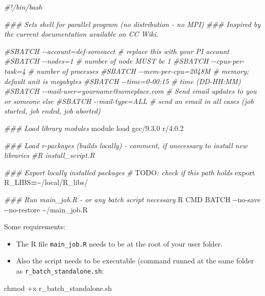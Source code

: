 \documentclass[
]{book}
\newenvironment{Shaded}{\begin{snugshade}}{\end{snugshade}}
\newcommand{\AlertTok}[1]{\textcolor[rgb]{0.94,0.16,0.16}{#1}}
\newcommand{\AttributeTok}[1]{\textcolor[rgb]{0.77,0.63,0.00}{#1}}
\newcommand{\BuiltInTok}[1]{#1}
\newcommand{\CommentTok}[1]{\textcolor[rgb]{0.56,0.35,0.01}{\textit{#1}}}
\newcommand{\ExtensionTok}[1]{#1}
\newcommand{\FunctionTok}[1]{\textcolor[rgb]{0.00,0.00,0.00}{#1}}
\newcommand{\NormalTok}[1]{#1}
\newcommand{\OperatorTok}[1]{\textcolor[rgb]{0.81,0.36,0.00}{\textbf{#1}}}
\newcommand{\VariableTok}[1]{\textcolor[rgb]{0.00,0.00,0.00}{#1}}
\providecommand{\tightlist}{%
  \setlength{\itemsep}{0pt}\setlength{\parskip}{0pt}}
\begin{document}
\begin{Shaded}
\begin{Highlighting}[]
\CommentTok{\#!/bin/bash}

\CommentTok{\#\#\# Sets shell for parallel program (no distribution {-} no MPI)}
\CommentTok{\#\#\# Inspired by the current documentation available on CC Wiki.}

\CommentTok{\#SBATCH {-}{-}account=def{-}someacct             \# replace this with your PI account}
\CommentTok{\#SBATCH {-}{-}nodes=1                          \# number of node MUST be 1}
\CommentTok{\#SBATCH {-}{-}cpus{-}per{-}task=4                  \# number of processes}
\CommentTok{\#SBATCH {-}{-}mem{-}per{-}cpu=2048M                \# memory; default unit is megabytes}
\CommentTok{\#SBATCH {-}{-}time=0{-}00:15                     \# time (DD{-}HH:MM)}
\CommentTok{\#SBATCH {-}{-}mail{-}user=yourname@someplace.com \# Send email updates to you or someone else}
\CommentTok{\#SBATCH {-}{-}mail{-}type=ALL                    \# send an email in all cases (job started, job ended, job aborted)}

\CommentTok{\#\#\# Load library modules}
\ExtensionTok{module}\NormalTok{ load gcc/9.3.0 r/4.0.2}

\CommentTok{\#\#\# Load r{-}packages (builds locally) {-} comment, if unecessary to install new libraries}
\CommentTok{\#R install\_script.R}

\CommentTok{\#\#\# Export locally installed packages}
\CommentTok{\# }\AlertTok{TODO}\CommentTok{: check if this path holds}
\BuiltInTok{export} \VariableTok{R\_LIBS}\OperatorTok{=}\NormalTok{\textasciitilde{}/local/R\_libs/}

\CommentTok{\#\#\# Run main\_job.R {-} or any batch script necessary}
\ExtensionTok{R}\NormalTok{ CMD BATCH }\AttributeTok{{-}{-}no{-}save} \AttributeTok{{-}{-}no{-}restore}\NormalTok{ \textasciitilde{}/main\_job.R}
\end{Highlighting}
\end{Shaded}

Some requirements:

\begin{itemize}
\tightlist
\item
  The R file \texttt{main\_job.R} needs to be at the root of your user folder.
\item
  Also the script needs to be executable (command runned at the same folder
  as \texttt{r\_batch\_standalone.sh}:
\end{itemize}

\begin{Shaded}
\begin{Highlighting}[]
\FunctionTok{chmod}\NormalTok{ +x r\_batch\_standalone.sh}
\end{Highlighting}
\end{Shaded}
\end{document}
